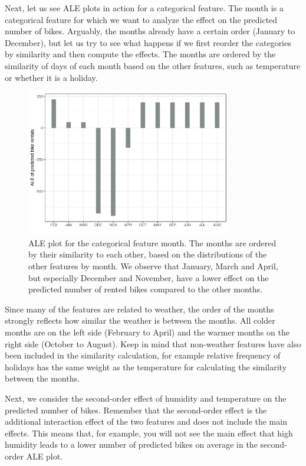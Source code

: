 \documentclass[
  10pt,
]{scrbook}
\begin{document}
Next, let us see ALE plots in action for a categorical feature.
The month is a categorical feature for which we want to analyze the effect on the predicted number of bikes.
Arguably, the months already have a certain order (January to December), but let us try to see what happens if we first reorder the categories by similarity and then compute the effects.
The months are ordered by the similarity of days of each month based on the other features, such as temperature or whether it is a holiday.

\begin{figure}

{\centering \includegraphics[width=0.8\textwidth]{images/ale-bike-cat-1} 

}

\caption{ALE plot for the categorical feature month. The months are ordered by their similarity to each other, based on the distributions of the other features by month. We observe that January, March and April, but especially December and November, have a lower effect on the predicted number of rented bikes compared to the other months.}\label{fig:ale-bike-cat}
\end{figure}

Since many of the features are related to weather, the order of the months strongly reflects how similar the weather is between the months.
All colder months are on the left side (February to April) and the warmer months on the right side (October to August).
Keep in mind that non-weather features have also been included in the similarity calculation, for example relative frequency of holidays has the same weight as the temperature for calculating the similarity between the months.

Next, we consider the second-order effect of humidity and temperature on the predicted number of bikes.
Remember that the second-order effect is the additional interaction effect of the two features and does not include the main effects.
This means that, for example, you will not see the main effect that high humidity leads to a lower number of predicted bikes on average in the second-order ALE plot.
\end{document}
